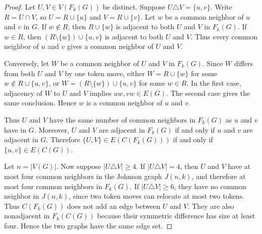 \documentclass[10pt,a4paper]{amsart}
\begin{document}
\begin{proof}
Let $U,V\in V(F_k(G))$ be distinct. Suppose $U\triangle V=\{u,v\}$. Write $R=U\cap V$, so $U=R\cup\{u\}$ and $V=R\cup\{v\}$. Let $w$ be a common neighbor of $u$ and $v$ in $G$. If $w\notin R$, then $R\cup\{w\}$ is adjacent to both $U$ and $V$ in $F_k(G)$. If $w\in R$, then $(R\setminus\{w\})\cup\{u,v\}$ is adjacent to both $U$ and $V$. Thus every common neighbor of $u$ and $v$ gives a common neighbor of $U$ and $V$.

Conversely, let $W$ be a common neighbor of $U$ and $V$ in $F_k(G)$. Since $W$ differs from both $U$ and $V$ by one token move, either $W=R\cup\{w\}$ for some $w\notin R\cup\{u,v\}$, or $W=(R\setminus\{w\})\cup\{u,v\}$ for some $w\in R$. In the first case, adjacency of $W$ to $U$ and $V$ implies $uw,vw\in E(G)$. The second case gives the same conclusion. Hence $w$ is a common neighbor of $u$ and $v$.

Thus $U$ and $V$ have the same number of common neighbors in $F_k(G)$ as $u$ and $v$ have in $G$. Moreover, $U$ and $V$ are adjacent in $F_k(G)$ if and only if $u$ and $v$ are adjacent in $G$. Therefore $\{U,V\}\in E(C(F_k(G)))$ if and only if $\{u,v\}\in E(C(G))$.

Let $n=|V(G)|$. Now suppose $|U\triangle V|\geq 4$. If $|U\triangle V|=4$, then $U$ and $V$ have at most four common neighbors in the Johnson graph $J(n,k)$, and therefore at most four common neighbors in $F_k(G)$. If $|U\triangle V|\geq 6$, they have no common neighbor in $J(n,k)$, since two token moves can relocate at most two tokens. Thus $C(F_k(G))$ does not add an edge between $U$ and $V$. They are also nonadjacent in $F_k(C(G))$ because their symmetric difference has size at least four. Hence the two graphs have the same edge set.
\end{proof}
\end{document}
